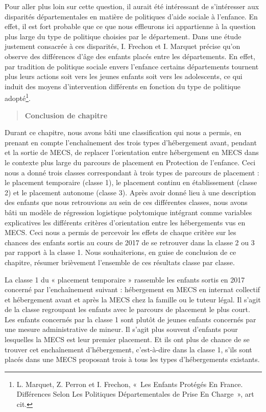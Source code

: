 \documentclass[
  12,
  a4paper,
]{report}
\begin{document}
Pour aller plus loin sur cette question, il aurait été intéressant de
s'intéresser aux disparités départementales en matière de politiques
d'aide sociale à l'enfance. En effet, il est fort probable que ce que
nous effleurons ici appartienne à la question plus large du type de
politique choisies par le département. Dans une étude justement
consacrée à ces disparités, I. Frechon et I. Marquet précise qu'on
observe des différences d'âge des enfants placés entre les départements.
En effet, par tradition de politique sociale envers l'enfance certains
départements tournent plus leurs actions soit vers les jeunes enfants
soit vers les adolescents, ce qui induit des moyens d'intervention
différents en fonction du type de politique adopté\footnote{L. Marquet,
  Z. Perron et I. Frechon, {«~Les Enfants Protégés En {France}.
  {Différences} Selon Les Politiques Départementales de Prise En
  Charge~»}, art cit.}.

\begin{quote}
\textbf{Conclusion de chapitre}
\end{quote}

Durant ce chapitre, nous avons bâti une classification qui nous a
permis, en prenant en compte l'enchaînement des trois types
d'hébergement avant, pendant et la sortie de MECS, de replacer
l'orientation entre hébergement en MECS dans le contexte plus large du
parcours de placement en Protection de l'enfance. Ceci nous a donné
trois classes correspondant à trois types de parcours de placement : le
placement temporaire (classe 1), le placement continu en établissement
(classe 2) et le placement autonome (classe 3). Après avoir donné lieu à
une description des enfants que nous retrouvions au sein de ces
différentes classes, nous avons bâti un modèle de régression logistique
polytomique intégrant comme variables explicatives les différents
critères d'orientation entre les hébergements vus en MECS. Ceci nous a
permis de percevoir les effets de chaque critère sur les chances des
enfants sortis au cours de 2017 de se retrouver dans la classe 2 ou 3
par rapport à la classe 1. Nous souhaiterions, en guise de conclusion de
ce chapitre, résumer brièvement l'ensemble de ces résultats classe par
classe.

La classe 1 du « placement temporaire » rassemble les enfants sortis en
2017 concerné par l'enchaînement suivant : hébergement en MECS en
internat collectif et hébergement avant et après la MECS chez la famille
ou le tuteur légal. Il s'agit de la classe regroupant les enfants avec
le parcours de placement le plus court. Les enfants concernés par la
classe 1 sont plutôt de jeunes enfants concernés par une mesure
administrative de mineur. Il s'agit plus souvent d'enfants pour
lesquelles la MECS est leur premier placement. Et ils ont plus de chance
de se trouver cet enchaînement d'hébergement, c'est-à-dire dans la
classe 1, s'ils sont placés dans une MECS proposant trois à tous les
types d'hébergements existants.
\end{document}
